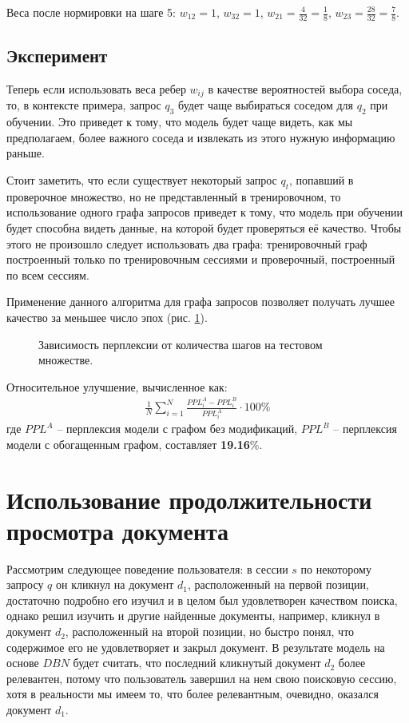 \documentclass[diploma]{nanolab2015}
\begin{document}
Веса после нормировки на шаге 5: $w_{12} = 1$, $w_{32} = 1$, $w_{21} = \frac{4}{32} = \frac{1}{8}$, $w_{23} = \frac{28}{32} = \frac{7}{8}$.

\subsection{Эксперимент}
Теперь если использовать веса ребер $w_{ij}$ в качестве вероятностей выбора соседа, то, в контексте примера, запрос $q_3$ будет чаще выбираться соседом для $q_2$ при обучении. Это приведет к тому, что модель будет чаще видеть, как мы предполагаем, более важного соседа и извлекать из этого нужную информацию раньше.

Стоит заметить, что если существует некоторый запрос $q_t$, попавший в проверочное множество, но не представленный в тренировочном, то использование одного графа запросов приведет к тому, что модель при обучении будет способна видеть данные, на которой будет проверяться её качество. Чтобы этого не произошло следует использовать два графа: тренировочный граф построенный только по тренировочным сессиями и проверочный, построенный по всем сессиям.

Применение данного алгоритма для графа запросов позволяет получать лучшее качество за меньшее число эпох (рис. \ref{pic4}). 

\begin{figure}[ht]
    \centering
    \caption{Зависимость перплексии от количества шагов на тестовом множестве.}
    
    \label{pic4}
\end{figure}

Относительное улучшение, вычисленное как:
\begin{align}
    \frac{1}{N} \sum_{i=1}^{N} \frac{PPL_i^A - PPL_i^B}{PPL_i^A} \cdot 100\%
\end{align}
где $PPL^A$ -- перплексия модели с графом без модификаций, $PPL^B$ -- перплексия модели с обогащенным графом, составляет \textbf{19.16}\%. 

\section{Использование продолжительности просмотра документа}
Рассмотрим следующее поведение пользователя: в сессии $s$ по некоторому запросу $q$ он кликнул на документ $d_1$, расположенный на первой позиции, достаточно подробно его изучил и в целом был удовлетворен качеством поиска, однако решил изучить и другие найденные документы, например, кликнул в документ $d_2$, расположенный на второй позиции, но быстро понял, что содержимое его не удовлетворяет и закрыл документ. В результате модель на основе $DBN$ будет считать, что последний кликнутый документ $d_2$ более релевантен, потому что пользователь завершил на нем свою поисковую сессию, хотя в реальности мы имеем то, что более релевантным, очевидно, оказался документ $d_1$.
\end{document}
